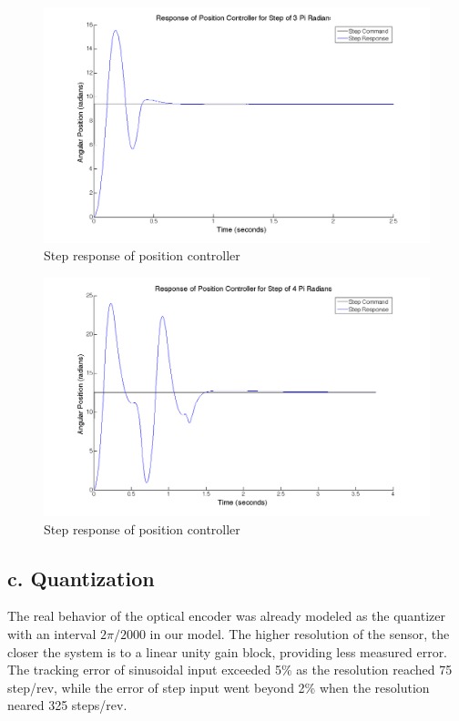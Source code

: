 \documentclass{article}
\theoremstyle{plain}
\theoremstyle{definition}
\theoremstyle{remark}
\begin{document}
\begin{figure}[htb]
\begin{center}
\includegraphics[width = 14cm]{posstep_3pi.png}
\caption{Step response of position controller}
\label{q5_b4}
\end{center}
\end{figure}

\begin{figure}[htb]
\begin{center}
\includegraphics[width = 14cm]{posstep_4pi.png}
\caption{Step response of position controller}
\label{q5_b5}
\end{center}
\end{figure}

\clearpage

\subsection*{c. Quantization}
The real behavior of the optical encoder was already modeled as the quantizer with an interval $2\pi/2000$ in our model. The higher resolution of the sensor, the closer the system is to a  linear unity gain block, providing less measured error. The tracking error of sinusoidal input exceeded 5\% as the resolution reached 75 step/rev, while the error of step input went beyond 2\% when the resolution neared 325 steps/rev. \\
\end{document}
